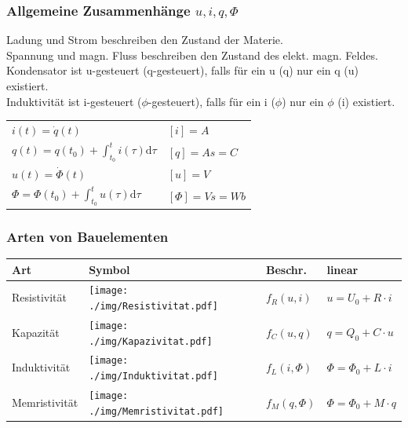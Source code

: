 \documentclass[fs, footer]{latex4ei}
\begin{document}
\begin{multicols*}{4}
    \subsubsection{Allgemeine Zusammenhänge $u,i,q,\Phi$}
    Ladung und Strom beschreiben den Zustand der Materie.\\
    Spannung und magn. Fluss beschreiben den Zustand des elekt. magn. Feldes.\\
    Kondensator ist u-gesteuert (q-gesteuert), falls für ein u (q) nur ein q (u)  existiert. \\
    Induktivität ist i-gesteuert ($\phi$-gesteuert), falls für ein i ($\phi$) nur ein $\phi$ (i) existiert. \\
    \begin{tabular}{l|l}
        $i(t) = \dot q(t)$                                      & $[i]=A$        \\
        $q(t) = q(t_0) + \int_{t_0}^t i(\tau) \mathrm d\tau$    & $[q]=As=C$     \\ \hline
        $u(t) = \dot \Phi(t)$                                   & $[u]=V$        \\
        $\Phi = \Phi(t_0) + \int_{t_0}^t u(\tau) \mathrm d\tau$ & $[\Phi]=Vs=Wb$ \\
    \end{tabular}

    \subsubsection{Arten von Bauelementen}
    \begin{tabular}{l|l|l|l}
        Art           & Symbol                                                  & Beschr.       & linear                      \\ \hline
        Resistivität  & \texttt{[image: ./img/Resistivitat.pdf]}  & $f_R(u,i)$    & $u = U_0 + R \cdot i$       \\
        Kapazität     & \texttt{[image: ./img/Kapazivitat.pdf]}   & $f_C(u,q)$    & $q = Q_0 + C \cdot u$       \\
        Induktivität  & \texttt{[image: ./img/Induktivitat.pdf]}  & $f_L(i,\Phi)$ & $\Phi = \Phi_0 + L \cdot i$ \\
        Memristivität & \texttt{[image: ./img/Memristivitat.pdf]} & $f_M(q,\Phi)$ & $\Phi = \Phi_0 + M \cdot q$ \\
    \end{tabular}

\end{multicols*}
\end{document}
